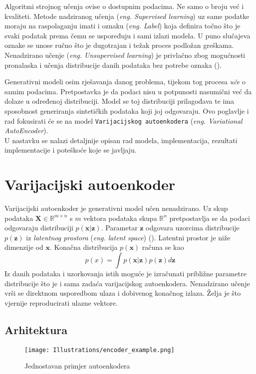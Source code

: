 Algoritmi strojnog učenja ovise o dostupnim podacima.
Ne samo o broju već i kvaliteti.
Metode nadziranog učenja (\emph{eng. Supervised learning}) uz same podatke moraju na raspolaganju imati i oznaku (\emph{eng. Label}) koja definira točno što je svaki podatak prema čemu se uspoređuju i sami izlazi modela.
U puno slučajeva oznake se unose ručno što je dugotrajan i težak proces podložan greškama.
Nenadzirano učenje (\emph{eng. Unsupervised learning}) je privlačno zbog mogućnosti pronalaska i učenja distribucije danih podataka bez potrebe oznaka (\cite{ev_var_ae}).

Generativni modeli osim rješavanja danog problema, tijekom tog procesa \emph{uče} o samim podacima.
Pretpostavka je da podaci nisu u potpunosti nasumični već da dolaze u određenoj distribuciji.
Model se toj distribuciji prilagođava te ima sposobnost generiranja sintetičkih podataka koji joj odgovaraju.
Ovo poglavlje i rad fokusirati će se na model \texttt{Varijacijskog autoenkodera} (\emph{eng. Variational AutoEncoder}). \\
U nastavku se nalazi detaljnije opisan rad modela, implementacija, rezultati implementacije i poteškoće koje se javljaju.

\section{Varijacijski autoenkoder}
Varijacijski autoenkoder je generativni model učen nenadzirano.
Uz skup podataka $\boldsymbol{X} \in \mathbb{R}^{m \times n}$ s $m$ vektora podataka skupa $\mathbb{R}^{n}$ pretpostavlja se da podaci odgovaraju distribuciji $p(\boldsymbol{x}|\boldsymbol{z})$.
Parametar $\boldsymbol{z}$ odgovara uzorcima distribucije $p(\boldsymbol{z})$ iz \emph{latentnog prostora} (\emph{eng. latent space}) (\cite{ev_var_ae}).
Latentni prostor je niže dimenzije od $\boldsymbol{x}$.
Konačna distribucija $p(\boldsymbol{x})$ računa se kao
$$p(x) = \int p(\boldsymbol{x} | \boldsymbol{z})p(\boldsymbol{z})d\boldsymbol{z}$$
Iz danih podataka i uzorkovanja istih moguće je izračunati približne parametre distribucije što je i sama zadaća varijacijskog autoenkodera.
Nenadzirano učenje vrši se direktnom usporedbom ulaza i dobivenog konačnog izlaza.
Želja je što vjernije reproducirati ulazne vektore.

\subsection{Arhitektura}

\begin{figure}[H]
	\centering
	\texttt{[image: Illustrations/encoder\_example.png]}
	\caption{Jednostavan primjer autoenkodera}
	\label{fig:autoencoder_example}
\end{figure}

